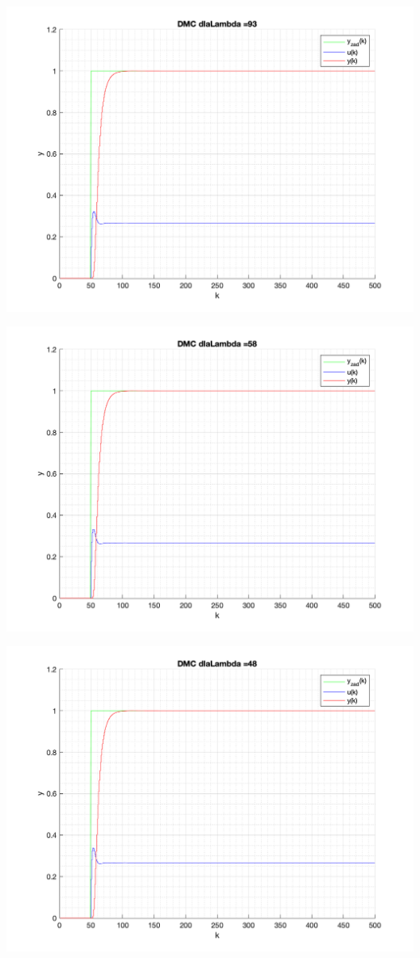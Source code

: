 \documentclass[a4paper, 11pt]{article}
\begin{document}
\begin{enumerate}
 \includegraphics[width=\linewidth]{./ModelsP4_Lambda/P4_DMC_Lambda_93_png.png} 
 
 \includegraphics[width=\linewidth]{./ModelsP4_Lambda/P4_DMC_Lambda_58_png.png} 
 
 \includegraphics[width=\linewidth]{./ModelsP4_Lambda/P4_DMC_Lambda_48_png.png} 
 

\end{enumerate}
\end{document}
